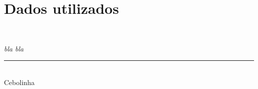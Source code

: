 
\chapter{Dados utilizados}

\vspace{-1cm} 
~
\begin{flushright}
\begin{minipage}[t]{6cm}
{\footnotesize\textit{bla bla}}\\
\rule[0.01mm]{6cm}{0.01mm}\\
{\footnotesize Cebolinha}
\end{minipage}
\end{flushright}
\vspace{0.5cm}

